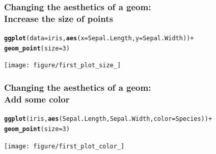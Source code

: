 \documentclass{beamer}\usepackage[]{graphicx}\usepackage[]{color}
\makeatletter
\newcommand{\hlnum}[1]{\textcolor[rgb]{0.686,0.059,0.569}{#1}}%
\newcommand{\hlopt}[1]{\textcolor[rgb]{0,0,0}{#1}}%
\newcommand{\hlstd}[1]{\textcolor[rgb]{0.345,0.345,0.345}{#1}}%
\newcommand{\hlkwc}[1]{\textcolor[rgb]{0.333,0.667,0.333}{#1}}%
\newcommand{\hlkwd}[1]{\textcolor[rgb]{0.737,0.353,0.396}{\textbf{#1}}}%
\newenvironment{kframe}{%
 \def\at@end@of@kframe{}%
 \ifinner\ifhmode%
  \def\at@end@of@kframe{\end{minipage}}%
  \begin{minipage}{\columnwidth}%
 \fi\fi%
 \def\FrameCommand##1{\hskip\@totalleftmargin \hskip-\fboxsep
 \colorbox{shadecolor}{##1}\hskip-\fboxsep
     \hskip-\linewidth \hskip-\@totalleftmargin \hskip\columnwidth}%
 \MakeFramed {\advance\hsize-\width
   \@totalleftmargin\z@ \linewidth\hsize
   \@setminipage}}%
 {\par\unskip\endMakeFramed%
 \at@end@of@kframe}
\newenvironment{knitrout}{}{} %
\makeatother
\begin{document}

\begin{frame}[fragile]
\frametitle{Changing the aesthetics of a geom: \\Increase the size of points}
\begin{knitrout}\footnotesize
{}\color{fgcolor}\begin{kframe}
\begin{alltt}
\hlkwd{ggplot}\hlstd{(}\hlkwc{data} \hlstd{= iris,} \hlkwd{aes}\hlstd{(}\hlkwc{x} \hlstd{= Sepal.Length,} \hlkwc{y} \hlstd{= Sepal.Width))} \hlopt{+}
\hlkwd{geom_point}\hlstd{(}\hlkwc{size} \hlstd{=} \hlnum{3}\hlstd{)}
\end{alltt}
\end{kframe}

{\centering \texttt{[image: figure/first\_plot\_size\_]} 

}



\end{knitrout}
\end{frame}


\begin{frame}[fragile]
\frametitle{Changing the aesthetics of a geom: \\Add some color}
\begin{knitrout}\footnotesize
{}\color{fgcolor}\begin{kframe}
\begin{alltt}
\hlkwd{ggplot}\hlstd{(iris,} \hlkwd{aes}\hlstd{(Sepal.Length, Sepal.Width,} \hlkwc{color} \hlstd{= Species))} \hlopt{+}
\hlkwd{geom_point}\hlstd{(}\hlkwc{size} \hlstd{=} \hlnum{3}\hlstd{)}
\end{alltt}
\end{kframe}

{\centering \texttt{[image: figure/first\_plot\_color\_]} 

}



\end{knitrout}
\end{frame}

\end{document}
